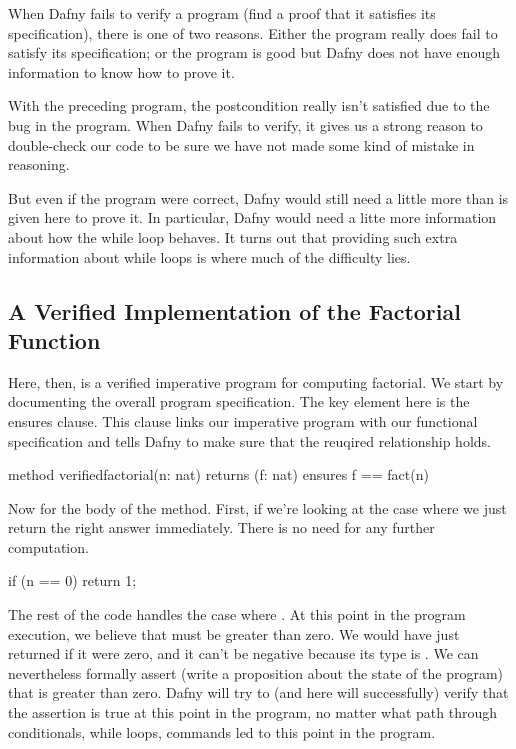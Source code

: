 \documentclass[letterpaper,10pt,english]{sphinxmanual}
\begin{document}
When Dafny fails to verify a program (find a proof that it satisfies
its specification), there is one of two reasons. Either the program
really does fail to satisfy its specification; or the program is good
but Dafny does not have enough information to know how to prove it.

With the preceding program, the postcondition really isn’t satisfied
due to the bug in the program. When Dafny fails to verify, it gives
us a strong reason to double-check our code to be sure we have not
made some kind of mistake in reasoning.

But even if the program were correct, Dafny would still need a little
more than is given here to prove it. In particular, Dafny would need a
litte more information about how the while loop behaves. It turns out
that providing such extra information about while loops is where much
of the difficulty lies.


\subsection{A Verified Implementation of the Factorial Function}
\label{\detokenize{05-putting-it-together:a-verified-implementation-of-the-factorial-function}}
Here, then, is a verified imperative program for computing
factorial. We start by documenting the overall program specification.
The key element here is the ensures clause. This clause links our
imperative program with our functional specification and tells Dafny
to make sure that the reuqired relationship holds.

\begin{sphinxVerbatim}[commandchars=\\\{\}]
method verified\PYGZus{}factorial(n: nat) returns (f: nat)
    ensures f == fact(n)
\end{sphinxVerbatim}

Now for the body of the method. First, if we’re looking at the case
where  we just return the right answer immediately. There is
no need for any further computation.

\begin{sphinxVerbatim}[commandchars=\\\{\}]
if (n == 0)
\PYGZob{}
    return 1;
\PYGZcb{}
\end{sphinxVerbatim}

The rest of the code handles the case where . At this point in
the program execution, we believe that  must be greater than zero.
We would have just returned if it were zero, and it can’t be negative
because its type is . We can nevertheless formally assert (write
a proposition about the state of the program) that  is greater than
zero. Dafny will try to (and here will successfully) verify that the
assertion is true at this point in the program, no matter what path
through conditionals, while loops, commands led to this point in the
program.
\end{document}
